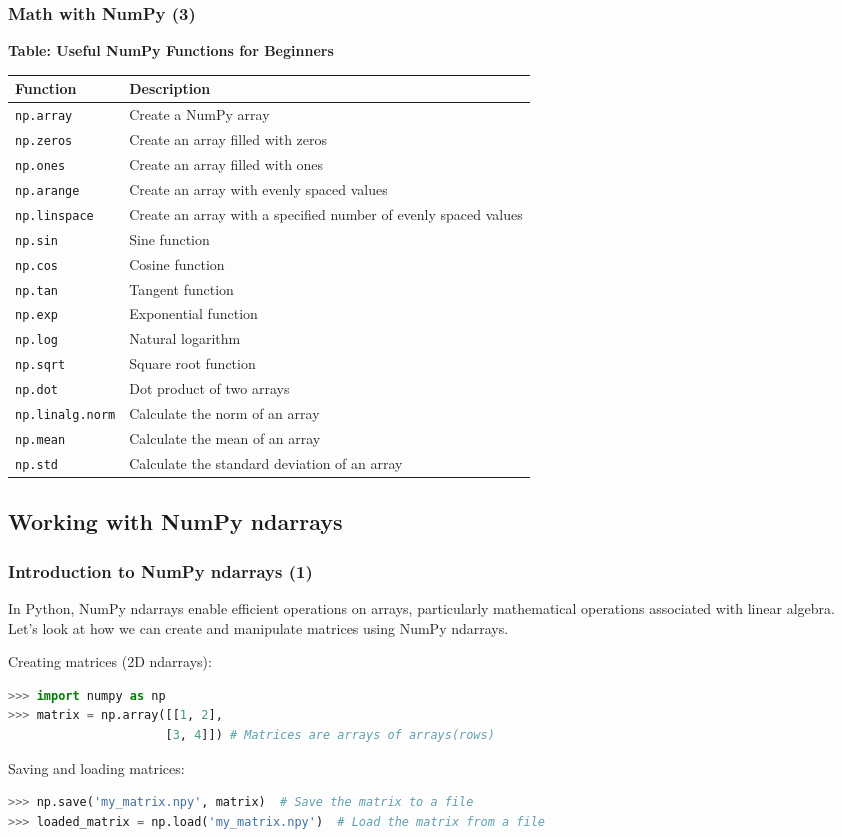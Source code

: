\begin{frame}[fragile]
  \frametitle{Math with NumPy (3)}
  \textbf{Table: Useful NumPy Functions for Beginners}

  \begin{tabular}{l|l}
  Function & Description \\
  \hline
  \lstinline$np.array$ & Create a NumPy array \\
  \lstinline$np.zeros$ & Create an array filled with zeros \\
  \lstinline$np.ones$ & Create an array filled with ones \\
  \lstinline$np.arange$ & Create an array with evenly spaced values \\
  \lstinline$np.linspace$ & Create an array with a specified number of evenly spaced values \\
  \lstinline$np.sin$ & Sine function \\
  \lstinline$np.cos$ & Cosine function \\
  \lstinline$np.tan$ & Tangent function \\
  \lstinline$np.exp$ & Exponential function \\
  \lstinline$np.log$ & Natural logarithm \\
  \lstinline$np.sqrt$ & Square root function \\
  \lstinline$np.dot$ & Dot product of two arrays \\
  \lstinline$np.linalg.norm$ & Calculate the norm of an array \\
  \lstinline$np.mean$ & Calculate the mean of an array \\
  \lstinline$np.std$ & Calculate the standard deviation of an array \\
  \end{tabular}
\end{frame}


\subsection*{Working with NumPy ndarrays}
\begin{frame}[fragile]
  \frametitle{Introduction to NumPy ndarrays (1)}
  In Python, NumPy ndarrays enable efficient operations on arrays, particularly mathematical operations associated with linear algebra. Let's look at how we can create and manipulate matrices using NumPy ndarrays.\pause
  
  Creating matrices (2D ndarrays):
  \begin{lstlisting}[language=Python, numbers=none]
>>> import numpy as np
>>> matrix = np.array([[1, 2], 
                      [3, 4]]) # Matrices are arrays of arrays(rows)
  \end{lstlisting}\pause

  Saving and loading matrices:
  \begin{lstlisting}[language=Python, numbers=none]
>>> np.save('my_matrix.npy', matrix)  # Save the matrix to a file
>>> loaded_matrix = np.load('my_matrix.npy')  # Load the matrix from a file
  \end{lstlisting}
\end{frame}

